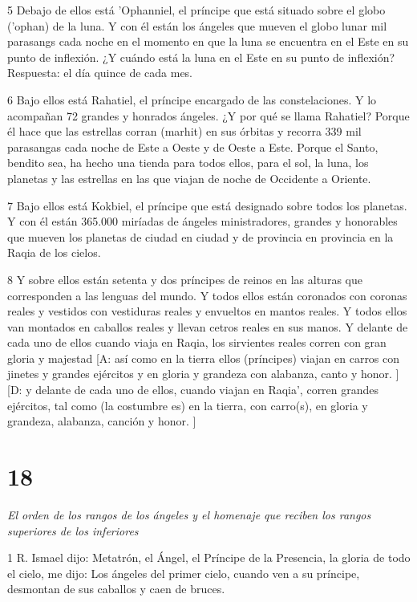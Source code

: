 \par 5 Debajo de ellos está 'Ophanniel, el príncipe que está situado sobre el globo ('ophan) de la luna. Y con él están los ángeles que mueven el globo lunar mil parasangs cada noche en el momento en que la luna se encuentra en el Este en su punto de inflexión. ¿Y cuándo está la luna en el Este en su punto de inflexión? Respuesta: el día quince de cada mes.

\par 6 Bajo ellos está Rahatiel, el príncipe encargado de las constelaciones. Y lo acompañan 72 grandes y honrados ángeles. ¿Y por qué se llama Rahatiel? Porque él hace que las estrellas corran (marhit) en sus órbitas y recorra 339 mil parasangas cada noche de Este a Oeste y de Oeste a Este. Porque el Santo, bendito sea, ha hecho una tienda para todos ellos, para el sol, la luna, los planetas y las estrellas en las que viajan de noche de Occidente a Oriente.

\par 7 Bajo ellos está Kokbiel, el príncipe que está designado sobre todos los planetas. Y con él están 365.000 miríadas de ángeles ministradores, grandes y honorables que mueven los planetas de ciudad en ciudad y de provincia en provincia en la Raqia de los cielos.

\par 8 Y sobre ellos están setenta y dos príncipes de reinos en las alturas que corresponden a las lenguas del mundo. Y todos ellos están coronados con coronas reales y vestidos con vestiduras reales y envueltos en mantos reales. Y todos ellos van montados en caballos reales y llevan cetros reales en sus manos. Y delante de cada uno de ellos cuando viaja en Raqia, los sirvientes reales corren con gran gloria y majestad [A: así como en la tierra ellos (príncipes) viajan en carros con jinetes y grandes ejércitos y en gloria y grandeza con alabanza, canto y honor. ] [D: y delante de cada uno de ellos, cuando viajan en Raqia', corren grandes ejércitos, tal como (la costumbre es) en la tierra, con carro(s), en gloria y grandeza, alabanza, canción y honor. ]


\chapter{18}

\par \textit{El orden de los rangos de los ángeles y el homenaje que reciben los rangos superiores de los inferiores}

\par 1 R. Ismael dijo: Metatrón, el Ángel, el Príncipe de la Presencia, la gloria de todo el cielo, me dijo: Los ángeles del primer cielo, cuando ven a su príncipe, desmontan de sus caballos y caen de bruces.

